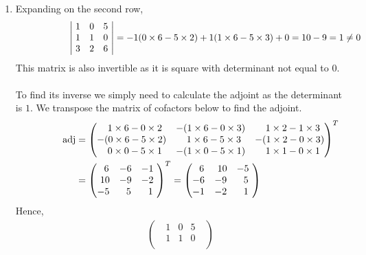 \documentclass[12pt]{amsart}
\begin{document}
\begin{enumerate}
\begin{enumerate}
			\item Expanding on the second row,
			\begin{align}
				\hspace{2cm} 
				\begin{vmatrix}
					\text{ }1 &0 &5 \text{ } \\
					\text{ }1 &1 &0 \text{ }  \\
					\text{ }3 &2 &6 \text{ } 
				\end{vmatrix}=-1(0\times6-5\times2)+1(1\times6-5\times3)+0=10-9=1 \ne 0 \notag
			\end{align}
			This matrix is also invertible as it is square with determinant not equal to $0$. 
			\\
			\\
			To find its inverse we simply need to calculate the adjoint as the determinant is $1$. We 					transpose the matrix of cofactors below to find the adjoint.
			\begin{align}
			\hspace{1.5cm} \text{adj}&=
				\begin{pmatrix}
					\text{ } \text{ }1\times6-0\times2 &-(1\times6-0\times3) &\text{ } \text{ } 
					1\times2-1\times3 \\
					-(0\times6-5\times2) &\text{ } \text{ }1\times6-5\times3 &-(1\times2-0\times3)\\
					\text{ } \text{ }0\times0-5\times1 &-(1\times0-5\times1) &\text{ } \text{ } 
					1\times1-0\times1
				\end{pmatrix}^T \notag \\
				&= 
				\begin{pmatrix}
					\text{ } \text{ }6 &-6 &-1 \text{ } \\
					\text{ }10 &-9 &-2 \text{ } \\
					-5 &\text{ } \text{ }5 &\text{ } \text{ }1 \text{ }
				\end{pmatrix}^T=
				\begin{pmatrix}
					\text{ } \text{ }6 &\text{ }10 &-5 \text{ } \\
					-6 &-9 &\text{ } \text{ }5 \text{ } \\
					-1 &-2 &\text{ } \text{ }1 \text{ }
				\end{pmatrix}
				\notag
			\end{align}
			Hence,
			\begin{align}
				\begin{pmatrix}
					\text{ }1 &0 &5 \text{ } \\
					\text{ }1 &1 &0 \text{ }  \\

\end{pmatrix}
\end{align}
\end{enumerate}
\end{enumerate}
\end{document}

